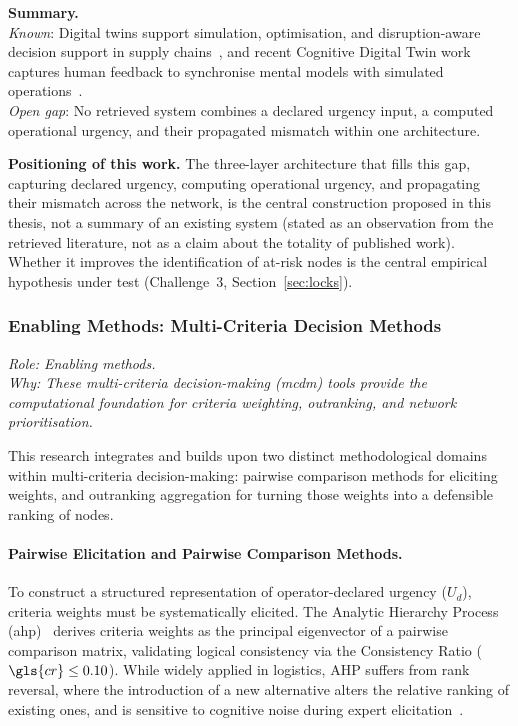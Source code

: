\medskip
\noindent\textbf{Summary.} \\
\textit{Known}: Digital twins support simulation, optimisation, and disruption-aware decision support in supply chains~\autocite{ivanov2021digital,ivanov2020digital}, and recent Cognitive Digital Twin work captures human feedback to synchronise mental models with simulated operations~\autocite{niloofar2023}. \\
\textit{Open gap}: No retrieved system combines a declared urgency input, a computed operational urgency, and their propagated mismatch within one architecture.

\noindent\textbf{Positioning of this work.} The three-layer architecture that fills this gap, capturing declared urgency, computing operational urgency, and propagating their mismatch across the network, is the central construction proposed in this thesis, not a summary of an existing system (stated as an observation from the retrieved literature, not as a claim about the totality of published work). Whether it improves the identification of at-risk nodes is the central empirical hypothesis under test (Challenge~3, Section~\ref{sec:locks}).

\subsubsection{Enabling Methods: Multi-Criteria Decision Methods}
\label{subsec:mcdm}

\noindent\textit{Role: Enabling methods. \\ Why: These multi-criteria decision-making (\gls{mcdm}) tools provide the computational foundation for criteria weighting, outranking, and network prioritisation.}

\medskip

This research integrates and builds upon two distinct methodological domains within multi-criteria decision-making: pairwise comparison methods for eliciting weights, and outranking aggregation for turning those weights into a defensible ranking of nodes.

\paragraph{Pairwise Elicitation and Pairwise Comparison Methods.}
To construct a structured representation of operator-declared urgency ($U_d$), criteria weights must be systematically elicited. The Analytic Hierarchy Process (\gls{ahp})~\autocite{saaty1980analytic} derives criteria weights as the principal eigenvector of a pairwise comparison matrix, validating logical consistency via the Consistency Ratio ($\gls{cr} \le 0.10$). While widely applied in logistics, AHP suffers from rank reversal, where the introduction of a new alternative alters the relative ranking of existing ones, and is sensitive to cognitive noise during expert elicitation~\autocite{dyer1990,triantaphyllou2024}.

